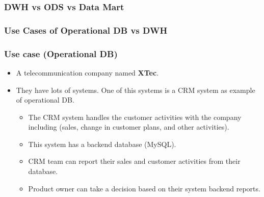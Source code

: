 
\begin{frame}
\frametitle{DWH vs ODS vs Data Mart}


\begin{table}[t]
\centering	
{}
\end{table}
\end{frame}


\subsubsection{Use Cases of Operational DB vs DWH}

\begin{frame}
\frametitle{Use case (Operational DB)}

\begin{itemize}[<+->]

\item A telecommunication company named \textbf{XTec}.
\newline
\item They have lots of systems. One of this systems is a CRM system as example of operational DB.
\begin{itemize}[<+->]

\item The CRM system handles the customer activities with the company including (sales, change in customer plans, and other activities).
\item This system has a backend database (MySQL).
\item CRM team can report their sales and customer activities from their database.
\item Product owner can take a decision based on their system backend reports.

\end{itemize}

\end{itemize}

\end{frame}

